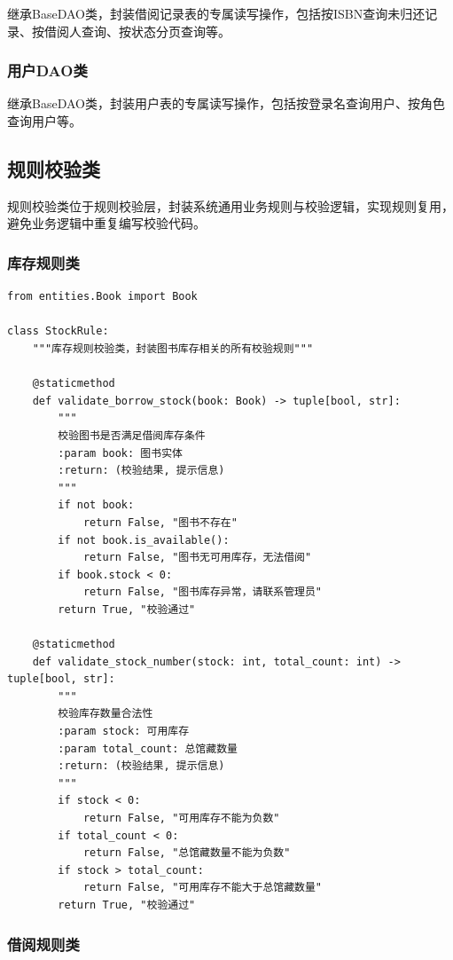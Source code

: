 \documentclass[12pt, a4paper]{article}
\begin{document}
继承BaseDAO类，封装借阅记录表的专属读写操作，包括按ISBN查询未归还记录、按借阅人查询、按状态分页查询等。

\subsubsection{用户DAO类}

继承BaseDAO类，封装用户表的专属读写操作，包括按登录名查询用户、按角色查询用户等。

\subsection{规则校验类}

规则校验类位于规则校验层，封装系统通用业务规则与校验逻辑，实现规则复用，避免业务逻辑中重复编写校验代码。

\subsubsection{库存规则类}

\begin{verbatim}
from entities.Book import Book

class StockRule:
    """库存规则校验类，封装图书库存相关的所有校验规则"""

    @staticmethod
    def validate_borrow_stock(book: Book) -> tuple[bool, str]:
        """
        校验图书是否满足借阅库存条件
        :param book: 图书实体
        :return: (校验结果, 提示信息)
        """
        if not book:
            return False, "图书不存在"
        if not book.is_available():
            return False, "图书无可用库存，无法借阅"
        if book.stock < 0:
            return False, "图书库存异常，请联系管理员"
        return True, "校验通过"

    @staticmethod
    def validate_stock_number(stock: int, total_count: int) -> tuple[bool, str]:
        """
        校验库存数量合法性
        :param stock: 可用库存
        :param total_count: 总馆藏数量
        :return: (校验结果, 提示信息)
        """
        if stock < 0:
            return False, "可用库存不能为负数"
        if total_count < 0:
            return False, "总馆藏数量不能为负数"
        if stock > total_count:
            return False, "可用库存不能大于总馆藏数量"
        return True, "校验通过"
\end{verbatim}

\subsubsection{借阅规则类}
\end{document}
